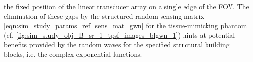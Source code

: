 the fixed position of
the linear transducer array on
a single edge of
the \ac{FOV}.
The elimination of
these gaps by
the structured random sensing matrix
\eqref{eqn:sim_study_params_ref_sens_mat_gwn} for
the tissue-mimicking phantom
(cf. \cref{fig:sim_study_obj_B_sr_1_tpsf_images_blgwn_1}) hints at
potential benefits provided by
the random waves for
the specified structural building blocks, i.e.
the complex exponential functions.

